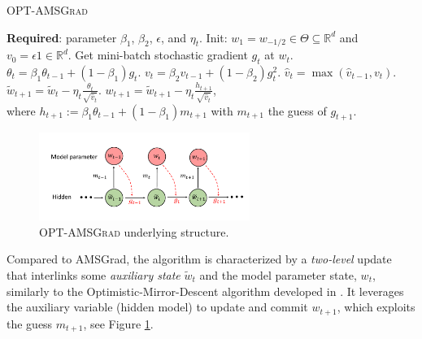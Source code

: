 \documentclass[wcp]{jmlr}
\begin{document}
\hspace{-0.2in}\begin{minipage}{0.5\linewidth}
\begin{algorithm}[H]
\begin{algorithmic}[1] 
\small
\caption{\textsc{OPT-AMSGrad}} \label{alg:optamsgrad}
\STATE \textbf{Required}: parameter $\beta_1$, $\beta_2$, $\epsilon$, and $\eta_t$. 
\STATE Init: $w_1 = w_{-1/2} \in \Theta \subseteq \mathbb R^d $ and $v_{0} = \epsilon 1 \in \mathbb R^{d}$.
\STATE Get mini-batch stochastic gradient $g_t$ at $w_t$.
\STATE $\theta_t = \beta_{1} \theta_{t-1} + (1 - \beta_{1}) g_t$.
\STATE $v_t = \beta_2 v_{t-1} + (1 - \beta_2) g_t^{2}$.
\STATE $\hat{v}_t = \max( \hat{v}_{t-1} , v_t )$. 
\STATE $\tilde{w}_{t+1} =  \tilde{w}_{t} - \eta_t \frac{\theta_t}{ \sqrt{\hat{v}_t }  } $.
\STATE $w_{t+1} = \tilde{w}_{t+1} - \eta_{t} \frac{h_{t+1}}{ \sqrt{\hat{v}_t } } $,  \\  
where $h_{t+1}:= \beta_{1} \theta_{t-1} + (1 - \beta_{1}) m_{t+1}$ with $m_{t+1}$ the guess of $g_{t+1}$. 
\ENDFOR 
\end{algorithmic}
\end{algorithm}\end{minipage}
\hfill
\begin{minipage}{0.5\linewidth}
\begin{figure}[H]
\captionsetup{justification=centering}
    \vspace{-0.1in}
    \includegraphics[width=2.7in]{plots/plot.pdf}
        \vspace{-0.1in}
    \caption{\textsc{OPT-AMSGrad} underlying structure.}
     \label{fig:scheme}
\end{figure}
\end{minipage}

\vspace{0.1in}
Compared to AMSGrad, the algorithm is characterized by a \emph{two-level} update that interlinks some \emph{auxiliary state} $\tilde{w}_{t}$ and the model parameter state, $w_t$, similarly to the Optimistic-Mirror-Descent algorithm developed in \citet{RS13b}.
It leverages the auxiliary variable (hidden model) to update and commit $w_{t+1}$, which exploits the guess $m_{t+1}$, see Figure \ref{fig:scheme}.
\end{document}
